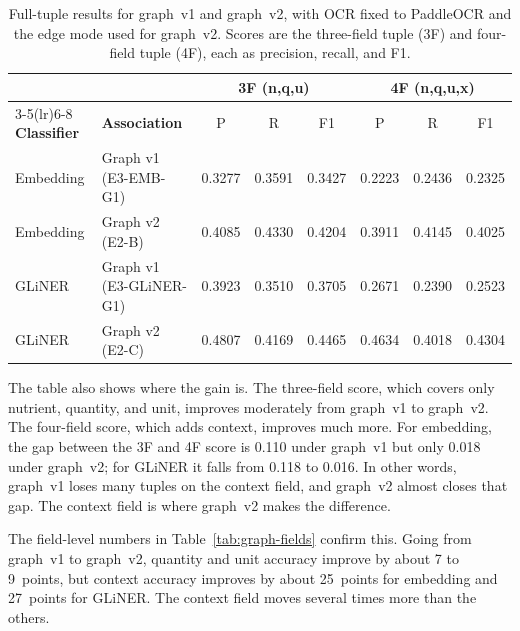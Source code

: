 \begin{table}[htbp]
  \centering
  \caption[Graph v1 versus graph v2: full-tuple results]{Full-tuple
    results for graph~v1 and graph~v2, with OCR fixed to PaddleOCR and the
     edge mode used for graph~v2. Scores are the
    three-field tuple (3F) and four-field tuple (4F), each as precision,
    recall, and F1.}
  \label{tab:graph-tuple}
  \small
  \begin{tabular}{@{}llcccccc@{}}
    \toprule
     & & \multicolumn{3}{c}{\textbf{3F (n,q,u)}} & \multicolumn{3}{c}{\textbf{4F (n,q,u,x)}} \\
    \cmidrule(lr){3-5}\cmidrule(lr){6-8}
    \textbf{Classifier} & \textbf{Association} & P & R & F1 & P & R & F1 \\
    \midrule
    Embedding & Graph v1 (E3-EMB-G1)    & 0.3277 & 0.3591 & 0.3427 & 0.2223 & 0.2436 & 0.2325 \\
    Embedding & Graph v2 (E2-B)         & 0.4085 & 0.4330 & 0.4204 & 0.3911 & 0.4145 & 0.4025 \\
    \addlinespace
    GLiNER    & Graph v1 (E3-GLiNER-G1) & 0.3923 & 0.3510 & 0.3705 & 0.2671 & 0.2390 & 0.2523 \\
    GLiNER    & Graph v2 (E2-C)         & 0.4807 & 0.4169 & 0.4465 & 0.4634 & 0.4018 & 0.4304 \\
    \bottomrule
  \end{tabular}
\end{table}

The table also shows where the gain is. The three-field score, which
covers only nutrient, quantity, and unit, improves moderately from
graph~v1 to graph~v2. The four-field score, which adds context, improves
much more. For embedding, the gap between the 3F and 4F score is 0.110
under graph~v1 but only 0.018 under graph~v2; for GLiNER it falls from
0.118 to 0.016. In other words, graph~v1 loses many tuples on the context
field, and graph~v2 almost closes that gap. The context field is where
graph~v2 makes the difference.

The field-level numbers in Table~\ref{tab:graph-fields} confirm this. Going
from graph~v1 to graph~v2, quantity and unit accuracy improve by about 7
to 9~points, but context accuracy improves by about 25~points for
embedding and 27~points for GLiNER. The context field moves several times
more than the others.

